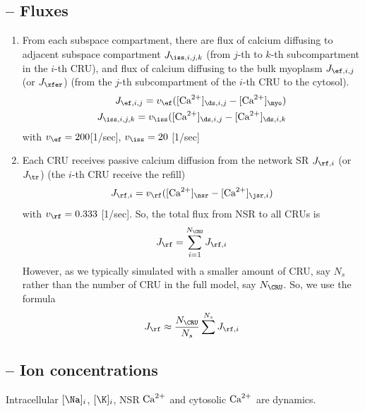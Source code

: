 \subsection{-- Fluxes}
\label{sec:fluxes-9}

\begin{enumerate}
\item From each subspace compartment, there are flux of calcium
  diffusing to adjacent subspace compartment $J_{\iss,i,j,k}$ (from
  $j$-th to $k$-th subcompartment in the $i$-th CRU), and flux of
  calcium diffusing to the bulk myoplasm $J_{\ef,i,j}$ (or $J_\xfer$)
  (from the $j$-th subcompartment of the $i$-th CRU to the cytosol).
  \begin{equation}
    \label{eq:1325}
    \begin{split}
      J_{\ef,i,j} = v_\ef( [\Ca]_{\ds,i,j}-[\Ca]_\myo)\\
      J_{\iss,i,j,k} = v_\iss ([\Ca]_{\ds,i,j}-[\Ca]_{\ds,i,k} \\
    \end{split}
  \end{equation}
with $v_\ef = 200$[1/sec], $v_\iss = 20$ [1/sec]

\item Each CRU receives passive calcium diffusion from the network SR
  $J_{\rf,i}$ (or $J_\tr$) (the $i$-th CRU receive the refill)
  \begin{equation}
    \label{eq:1326}
    J_{\rf,i} = v_\rf ([\Ca]_\nsr - [\Ca]_{\jsr,i})
  \end{equation}
with $v_\rf = 0.333$ [1/sec]. So, the total flux from NSR to all CRUs
is
\begin{equation}
  \label{eq:1327}
  J_\rf = \sum^{N_\CRU}_{i=1} J_{\rf,i}
\end{equation}
However, as we typically simulated with a smaller amount of CRU, say
$N_s$ rather than the number of CRU in the full model, say
$N_\CRU$. So, we use the formula
\begin{equation}
  \label{eq:1328}
  J_\rf \approx \frac{N_\CRU}{N_s}\sum^{N_s}J_{\rf,i}
\end{equation}
\end{enumerate}

\subsection{-- Ion concentrations}

Intracellular $[\Na]_i$, $[\K]_i$, NSR ${\text{Ca}^{2+}}$ and cytosolic ${\text{Ca}^{2+}}$ are dynamics. 


